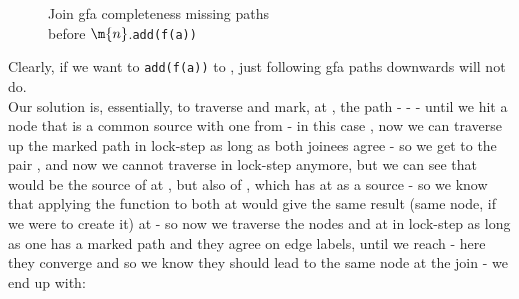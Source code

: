 \begin{figure}[H]

\caption{
Join gfa completeness missing paths\\
before $\m{n}$.\lstinline{add(f(a))}
}
\label{snippet3.20_graph2}
\end{figure}
Clearly, if we want to \lstinline{add(f(a))} to , just following gfa paths downwards will not do.\\
Our solution is, essentially, to traverse and mark, at , the path  -  -  - \s{()} until we hit a node that is a common source with one from  - in this case \s{()}, 
now we can traverse up the marked path in lock-step as long as both joinees agree - so we get to the pair \m{[\s{b},\s{a,b}]}, 
and now we cannot traverse in lock-step anymore, but we can see that  would be the source of  at , 
but also of , which has  at  as a source - so we know that applying the function  to both at  
would give the same result (same node, if we were to create it) at  - 
so now we traverse the nodes  and  at  in lock-step as long as one has a marked path and they agree on edge labels, until we reach  - here they converge and so we know they should lead to the same node at the join - we end up with:
